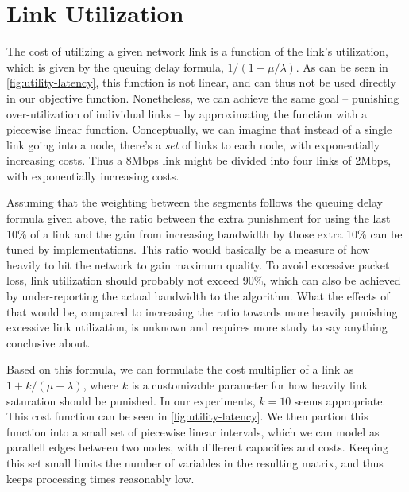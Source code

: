 

\section{Link Utilization}

The cost of utilizing a given network link is a function of the link's utilization, which is given by the queuing delay formula, $1/(1 - \mu/\lambda)$. As can be seen in \autoref{fig:utility-latency}, this function is not linear, and can thus not be used directly in our objective function. Nonetheless, we can achieve the same goal -- punishing over-utilization of individual links -- by approximating the function with a piecewise linear function. Conceptually, we can imagine that instead of a single link going into a node, there's a \emph{set} of links to each node, with exponentially increasing costs. Thus a 8Mbps link might be divided into four links of 2Mbps, with exponentially increasing costs.

Assuming that the weighting between the segments follows the queuing delay formula given above, the ratio between the extra punishment for using the last 10\% of a link and the gain from increasing bandwidth by those extra 10\% can be tuned by implementations. This ratio would basically be a measure of how heavily to hit the network to gain maximum quality. To avoid excessive packet loss, link utilization should probably not exceed 90\%, which can also be achieved by under-reporting the actual bandwidth to the algorithm. What the effects of that would be, compared to increasing the ratio towards more heavily punishing excessive link utilization, is unknown and requires more study to say anything conclusive about.


Based on this formula, we can formulate the cost multiplier of a link as $1 + k/(\mu - \lambda)$, where $k$ is a customizable parameter for how heavily link saturation should be punished. In our experiments, $k=10$ seems appropriate. This cost function can be seen in \autoref{fig:utility-latency}. We then partion this function into a small set of piecewise linear intervals, which we can model as parallell edges between two nodes, with different capacities and costs. Keeping this set small limits the number of variables in the resulting matrix, and thus keeps processing times reasonably low.

